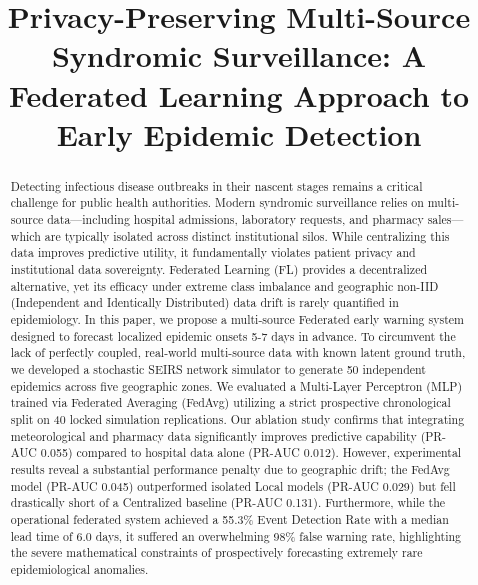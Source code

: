 \documentclass[conference]{IEEEtran}
\begin{document}
\title{Privacy-Preserving Multi-Source Syndromic Surveillance: A Federated Learning Approach to Early Epidemic Detection}

\author{
}

\maketitle

\begin{abstract}
Detecting infectious disease outbreaks in their nascent stages remains a critical challenge for public health authorities. Modern syndromic surveillance relies on multi-source data—including hospital admissions, laboratory requests, and pharmacy sales—which are typically isolated across distinct institutional silos. While centralizing this data improves predictive utility, it fundamentally violates patient privacy and institutional data sovereignty. Federated Learning (FL) provides a decentralized alternative, yet its efficacy under extreme class imbalance and geographic non-IID (Independent and Identically Distributed) data drift is rarely quantified in epidemiology. In this paper, we propose a multi-source Federated early warning system designed to forecast localized epidemic onsets 5-7 days in advance. To circumvent the lack of perfectly coupled, real-world multi-source data with known latent ground truth, we developed a stochastic SEIRS network simulator to generate 50 independent epidemics across five geographic zones. We evaluated a Multi-Layer Perceptron (MLP) trained via Federated Averaging (FedAvg) utilizing a strict prospective chronological split on 40 locked simulation replications. Our ablation study confirms that integrating meteorological and pharmacy data significantly improves predictive capability (PR-AUC 0.055) compared to hospital data alone (PR-AUC 0.012). However, experimental results reveal a substantial performance penalty due to geographic drift; the FedAvg model (PR-AUC 0.045) outperformed isolated Local models (PR-AUC 0.029) but fell drastically short of a Centralized baseline (PR-AUC 0.131). Furthermore, while the operational federated system achieved a 55.3\% Event Detection Rate with a median lead time of 6.0 days, it suffered an overwhelming 98\% false warning rate, highlighting the severe mathematical constraints of prospectively forecasting extremely rare epidemiological anomalies.
\end{abstract}
\end{document}
